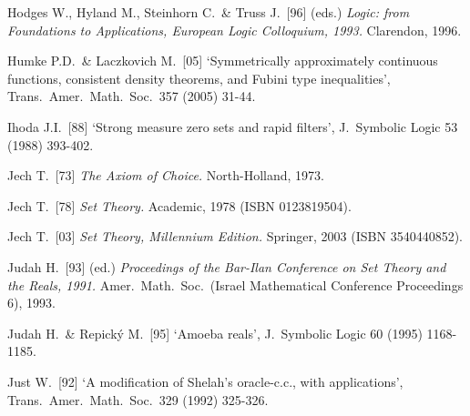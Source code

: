 {Hodges W., Hyland M., Steinhorn C.\ \& Truss J.\ [96] (eds.)
{\it Logic: from Foundations to Applications,
European Logic Colloquium, 1993.}
Clarendon, 1996.

Humke P.D.\ \& Laczkovich M.\ [05] `Symmetrically approximately
continuous functions, consistent density theorems, and Fubini type
inequalities', Trans.\ Amer.\ Math.\ Soc.\ 357 (2005) 31-44.
\cmmnt{[537Q, \S537 {\it notes\/}.]}

\medskip%

Ihoda J.I.\ [88] `Strong measure zero sets and rapid filters',
J.\ Symbolic Logic 53 (1988) 393-402.
\cmmnt{[534O.]}

\medskip%

Jech T.\ [73] {\it The Axiom of Choice.}  North-Holland, 1973.
\cmmnt{[561A, 561Xc, 561Yc, 561Yi, 564Yd.]}

Jech T.\ [78] {\it Set Theory.}  Academic, 1978 (ISBN 0123819504).

Jech T.\ [03] {\it Set Theory, Millennium Edition.}  Springer, 2003
(ISBN 3540440852).



Judah H.\ [93] (ed.) {\it Proceedings of the Bar-Ilan Conference on Set
Theory and the Reals, 1991.} Amer.\ Math.\ Soc.\ (Israel Mathematical
Conference Proceedings 6), 1993.

Judah H.\ \& Repick\'y M.\ [95] `Amoeba reals', J.\ Symbolic Logic 60 (1995) 1168-1185.
\cmmnt{[528N.]}



Just W.\ [92] `A modification of Shelah's oracle-c.c., with
applications', Trans.\ Amer.\ Math.\ Soc.\ 329 (1992) 325-326.
\cmmnt{[527M.]}

}
